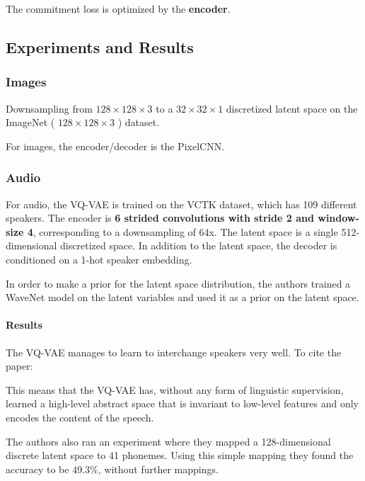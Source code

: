 The commitment loss is optimized by the \textbf{encoder}.



\subsection{Experiments and Results}

\subsubsection{Images}
Downsampling from \(128 \times 128 \times 3 \) to a \( 32 \times 32 \times 1 \) discretized latent space on the ImageNet ( \(128 \times 128 \times 3\) ) dataset.

For images, the encoder/decoder is the PixelCNN. 



\subsubsection{Audio}
For audio, the VQ-VAE is trained on the VCTK dataset, which has 109 different speakers. 
The encoder is \textbf{6 strided convolutions with stride 2 and window-size 4}, corresponding to a downsampling of 64x. 
The latent space is a single 512-dimensional discretized space. 
In addition to the latent space, the decoder is conditioned on a 1-hot speaker embedding. 

In order to make a prior for the latent space distribution, the authors trained a WaveNet model on the latent variables and used it as a prior on the latent space. \cite{oord_wavenet_2016}


\paragraph{Results}
The VQ-VAE manages to learn to interchange speakers very well. To cite the paper:

\begin{displayquote}
    This means that the VQ-VAE has, without any form of linguistic supervision, 
    learned a high-level abstract space that is invariant to low-level features and only encodes the content of the speech.
\end{displayquote}


The authors also ran an experiment where they mapped a 128-dimensional discrete latent space to 41 phonemes. 
Using this simple mapping they found the accuracy to be \(49.3\%\), without further mappings. 

